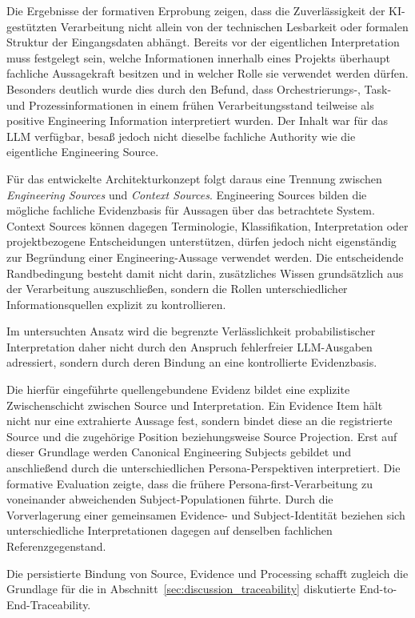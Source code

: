 Die Ergebnisse der formativen Erprobung zeigen, dass die Zuverlässigkeit der
KI-gestützten Verarbeitung nicht allein von der technischen Lesbarkeit oder
formalen Struktur der Eingangsdaten abhängt. Bereits vor der eigentlichen
Interpretation muss festgelegt sein, welche Informationen innerhalb eines
Projekts überhaupt fachliche Aussagekraft besitzen und in welcher Rolle sie
verwendet werden dürfen. Besonders deutlich wurde dies durch den Befund, dass
Orchestrierungs-, Task- und Prozessinformationen in einem frühen
Verarbeitungsstand teilweise als positive Engineering Information
interpretiert wurden. Der Inhalt war für das LLM verfügbar, besaß jedoch nicht
dieselbe fachliche Authority wie die eigentliche Engineering Source.

Für das entwickelte Architekturkonzept folgt daraus eine Trennung zwischen
\emph{Engineering Sources} und \emph{Context Sources}. Engineering Sources
bilden die mögliche fachliche Evidenzbasis für Aussagen über das betrachtete
System. Context Sources können dagegen Terminologie, Klassifikation,
Interpretation oder projektbezogene Entscheidungen unterstützen, dürfen jedoch
nicht eigenständig zur Begründung einer Engineering-Aussage verwendet werden.
Die entscheidende Randbedingung besteht damit nicht darin, zusätzliches Wissen
grundsätzlich aus der Verarbeitung auszuschließen, sondern die Rollen
unterschiedlicher Informationsquellen explizit zu kontrollieren.

Im untersuchten Ansatz wird die begrenzte Verlässlichkeit probabilistischer
Interpretation daher nicht durch den Anspruch fehlerfreier LLM-Ausgaben
adressiert, sondern durch deren Bindung an eine kontrollierte Evidenzbasis.

Die hierfür eingeführte quellengebundene Evidenz bildet eine explizite
Zwischenschicht zwischen Source und Interpretation. Ein Evidence Item hält
nicht nur eine extrahierte Aussage fest, sondern bindet diese an die
registrierte Source und die zugehörige Position beziehungsweise
Source Projection. Erst auf dieser Grundlage werden Canonical Engineering
Subjects gebildet und anschließend durch die unterschiedlichen
Persona-Perspektiven interpretiert. Die formative Evaluation zeigte, dass die
frühere Persona-first-Verarbeitung zu voneinander abweichenden
Subject-Populationen führte. Durch die Vorverlagerung einer gemeinsamen
Evidence- und Subject-Identität beziehen sich unterschiedliche
Interpretationen dagegen auf denselben fachlichen Referenzgegenstand.

Die persistierte Bindung von Source, Evidence und Processing schafft zugleich
die Grundlage für die in
Abschnitt~\ref{sec:discussion_traceability} diskutierte
End-to-End-Traceability.

